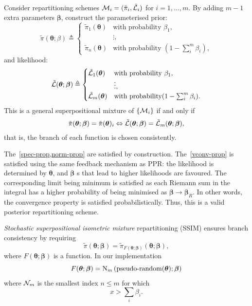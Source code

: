\documentclass[usenatbib]{mnras}
\begin{document}
Consider repartitioning schemes
${\cal M}_{i} = (\tilde{\pi}_{i}, \tilde{\cal L}_{i})$ for
$i=1, \ldots, m$. By adding \(m-1\) extra parameters $\bm{\beta}$,
construct the parameterised prior:
\begin{equation}
  \tilde{\pi}(\bm{\theta}; \beta)  \triangleq \begin{cases}
	\tilde{\pi}_{1}(\bm{\theta}) & \text{with probability } \beta_{1},\\
	& \vdots,\\
	\tilde{\pi}_{n}(\bm{\theta}) & \text{with probability } (1- \sum_{i}^{m}\beta_{i}),
	\end{cases}
\end{equation}
and likelihood:
\begin{equation}
  \tilde{\cal L}(\bm{\theta}; \bm{\beta})  \triangleq
  \begin{cases}
	\tilde{\cal L}_{1}(\bm{\theta}) &  \text{with probability } \beta_{1},\\
		    &\vdots,\\
	\tilde{\cal L}_{m}(\bm{\theta}) & \text{with probability} (1- \sum_{i}^{m}\beta_{i}).
\end{cases}
\end{equation}
This is a general superpositional mixture of $\{{\cal M}_{i}\}$ if and only if
\begin{equation}
  \label{eq:sspr}
  \tilde{\pi}(\bm{\theta}; \bm{\beta}) = \tilde{\pi}(\bm{\theta})_{i} \Leftrightarrow \tilde{\cal L}(\bm{\theta}; \bm{\beta}) = \tilde{\cal L}_{m}(\bm{\theta}; \bm{\beta}), 
\end{equation}
that is, the branch of each function is chosen consistently.

The~\cref{spec-prop,norm-prop} are satisfied by
construction. The~\cref{vconv-prop} is satisfied using the same
feedback mechanism as PPR: the likelihood is determined by
\(\bm{\theta}\), and \(\bm{\beta}\) s that lead to higher likelihoods are
favoured. The corresponding limit being minimum is satisfied as
each Riemann sum in the integral has a higher probability of being
minimised as \(\bm{\beta}\rightarrow\bm{\beta}_{R}\). In other words, the
convergence property is satisfied probabilistically. Thus, this is
a valid posterior repartitioning scheme.

\emph{Stochastic superpositional isometric mixture} repartitioning
(SSIM) ensures branch consistency by requiring
\begin{equation}
\tilde{\pi}(\bm{\theta}; \bm{\beta}) = \tilde{\pi}_{F(\bm{\theta};
  \bm{\beta})}(\bm{\theta};\bm{\beta}),
\end{equation}
where $F(\bm{\theta}; \bm{\beta})$ is a function. In our implementation
\begin{equation}
  F(\bm{\theta};\bm{\beta})= \text{{\cal N}}_{m}\left(\text{pseudo-random}(\bm{\theta}); \bm{\beta}\right)
\end{equation}
where \({\cal N}_{m}\) is the smallest index \(n \leq m\) for
which \[x > \sum_{i}\beta_{i}.\]
\end{document}
